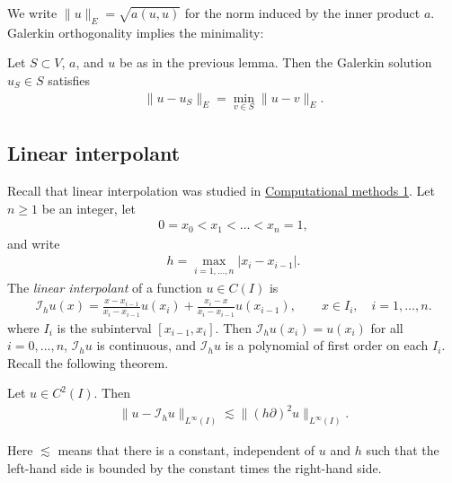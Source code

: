 \documentclass[12pt,oneside]{amsart}
\newcommand{\HOX}[1]{\todo[noline,color=white,size=\footnotesize]{#1}}
\def\I{\mathcal I}
\begin{document}
We write $\|u\|_E = \sqrt{a(u,u)}$ for the norm induced by the inner product $a$. Galerkin orthogonality implies the minimality:

\begin{corollary}\label{cor_abs_err}
Let $S \subset V$, $a$, and $u$ be as in the previous lemma. 
Then the Galerkin solution $u_S \in S$ satisfies
    \begin{align*}
\|u-u_S\|_E = \min_{v \in S} \|u - v\|_E.
    \end{align*}
\end{corollary}

\subsection{Linear interpolant}
\HOX{Will revisit this}
Recall that linear interpolation was studied in \href{https://github.com/uh-comp-methods1/notebooks/blob/main/interpolation/lecture.ipynb}{Computational methods 1}.
Let $n \ge 1$ be an integer, let 
    \begin{align}\label{def_mesh}
0 = x_0 < x_1 < \dots < x_n = 1,
    \end{align}
and write
    \begin{align}\label{def_mesh_size}
h = \max_{i=1,\dots,n} |x_i - x_{i-1}|.
    \end{align}
The {\em linear interpolant} of a function $u \in C(I)$ is 
    \begin{align*}
\I_h u(x) = \frac{x - x_{i-1}}{x_i - x_{i-1}} u(x_i) + \frac{x_{i} - x}{x_i - x_{i-1}} u(x_{i-1}), \qquad x \in I_i, \quad i = 1,\dots,n.
    \end{align*}
where $I_i$ is the subinterval $[x_{i-1}, x_i]$.
Then $\I_h u(x_i) = u(x_i)$ for all $i=0,\dots,n$, $\I_h u$ is continuous, and $\I_h u$ is a polynomial of first order on each $I_i$. 
Recall the following theorem.

\begin{theorem}
Let $u \in C^2(I)$. Then 
    \begin{align*}
\|u - \I_h u\|_{L^\infty(I)} \lesssim \|(h \partial)^2 u\|_{L^\infty(I)}.
    \end{align*}
\end{theorem}

Here $\lesssim$ means that there is a constant, independent of $u$ and $h$ such that the left-hand side is bounded by the constant times the right-hand side.
\end{document}
